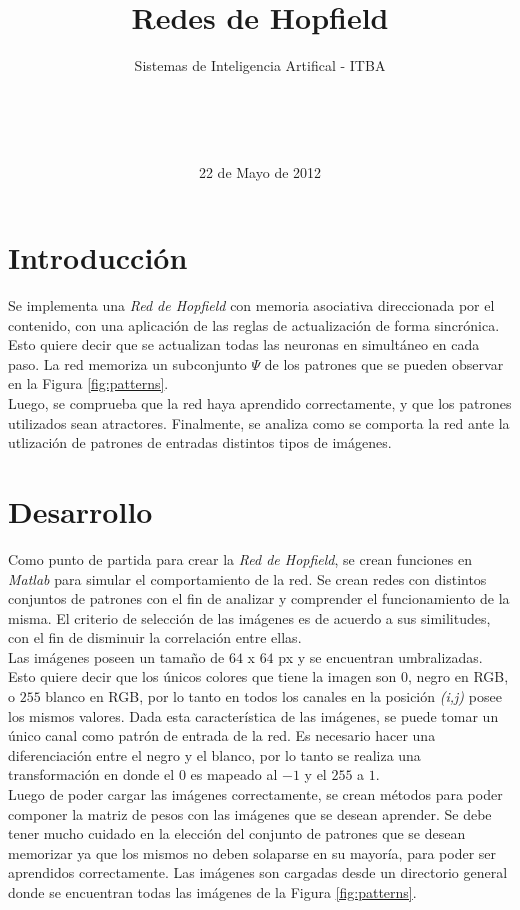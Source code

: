 \documentclass{sig-alternate}
\begin{document}

\title{Redes de Hopfield}
\subtitle{Sistemas de Inteligencia Artifical - ITBA}


\author{
	\\
	\\
	\\	
}

\date{22 de Mayo de 2012}

\maketitle

\section*{Introducción}
Se implementa una \textit{Red de Hopfield} con memoria asociativa direccionada por el contenido, con una aplicación de las reglas de actualización de forma sincrónica. Esto quiere decir que se actualizan todas las neuronas en simultáneo en cada paso. La red memoriza un subconjunto $\Psi$ de los patrones que se pueden observar en la Figura \ref{fig:patterns}.\\
Luego, se comprueba que la red haya aprendido correctamente, y que los patrones utilizados sean atractores. Finalmente, se analiza como se comporta la red ante la utlización de patrones de entradas distintos tipos de imágenes.\\

\section*{Desarrollo}
Como punto de partida para crear la \textit{Red de Hopfield}, se crean funciones en \textit{Matlab} para simular el comportamiento de la red. Se crean redes con distintos conjuntos de patrones con el fin de analizar y comprender el funcionamiento de la misma. El criterio de selección de las imágenes es de acuerdo a sus similitudes, con el fin de disminuir la correlación entre ellas.\\
Las imágenes poseen un tamaño de $64$ x $64$ px y se encuentran umbralizadas. Esto quiere decir que los únicos colores que tiene la imagen son $0$, negro en RGB, o $255$ blanco en RGB, por lo tanto en todos los canales en la posición \textit{(i,j)} posee los mismos valores. Dada esta característica de las imágenes, se puede tomar un único canal como patrón de entrada de la red. Es necesario hacer una diferenciación entre el negro y el blanco, por lo tanto se realiza una transformación en donde el $0$ es mapeado al $-1$ y el $255$ a $1$.\\
Luego de poder cargar las imágenes correctamente, se crean métodos para poder componer la matriz de pesos con las imágenes que se desean aprender. Se debe tener mucho cuidado en la elección del conjunto de patrones que se desean memorizar ya que los mismos no deben solaparse en su mayoría, para poder ser aprendidos correctamente. Las imágenes son cargadas desde un directorio general donde se encuentran todas las imágenes de la Figura \ref{fig:patterns}. 
\end{document}
